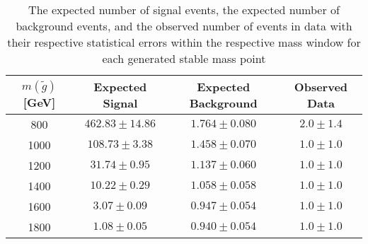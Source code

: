 \begin{table}[!htbp]
  \begin{center}
    \begin{tabular}{c|c|c|c}
      \hline
      $m(\tilde{g})$ [GeV]  & Expected Signal & Expected Background & Observed Data\\
      \hline
      800    & $462.83 \pm 14.86 $ & $1.764 \pm 0.080 $ & $2.0 \pm 1.4$ \\
      1000    & $108.73 \pm 3.38 $ & $1.458 \pm 0.070 $ & $1.0 \pm 1.0$ \\
      1200    & $31.74 \pm 0.95 $ & $1.137 \pm 0.060 $ & $1.0 \pm 1.0$ \\
      1400    & $10.22 \pm 0.29 $ & $1.058 \pm 0.058 $ & $1.0 \pm 1.0$ \\
      1600    & $3.07 \pm 0.09 $ & $0.947 \pm 0.054 $ & $1.0 \pm 1.0$ \\
      1800    & $1.08 \pm 0.05 $ & $0.940 \pm 0.054 $ & $1.0 \pm 1.0$ \\
      \hline
    \end{tabular}
  \end{center} 
  \caption{The expected number of signal events, the expected number of background events, and the observed number of events in data with their respective statistical errors within the respective mass window for each generated stable mass point}
  \label{tab:app_counts_stable}
\end{table}

